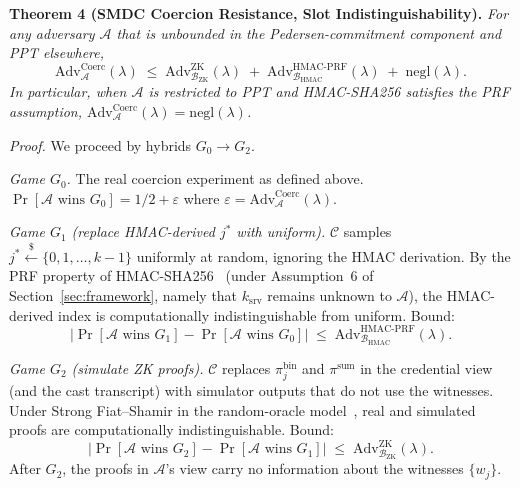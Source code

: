 \textbf{Theorem 4 (SMDC Coercion Resistance, Slot Indistinguishability).} \textit{For any adversary $\mathcal{A}$ that is unbounded in the Pedersen-commitment component and PPT elsewhere,}
\begin{equation}
    \mathrm{Adv}^{\mathrm{Coerc}}_{\mathcal{A}}(\lambda) \;\leq\; \mathrm{Adv}^{\mathrm{ZK}}_{\mathcal{B}_{\mathrm{ZK}}}(\lambda) \;+\; \mathrm{Adv}^{\mathrm{HMAC\text{-}PRF}}_{\mathcal{B}_{\mathrm{HMAC}}}(\lambda) \;+\; \mathrm{negl}(\lambda).
    \label{eq:t4-bound}
\end{equation}
\textit{In particular, when $\mathcal{A}$ is restricted to PPT and HMAC-SHA256 satisfies the PRF assumption, $\mathrm{Adv}^{\mathrm{Coerc}}_{\mathcal{A}}(\lambda) = \mathrm{negl}(\lambda)$.}

\textit{Proof.} We proceed by hybrids $G_0 \to G_2$.

\emph{Game $G_0$.} The real coercion experiment as defined above. $\Pr[\mathcal{A} \text{ wins } G_0] = 1/2 + \varepsilon$ where $\varepsilon = \mathrm{Adv}^{\mathrm{Coerc}}_{\mathcal{A}}(\lambda)$.

\emph{Game $G_1$ (replace HMAC-derived $j^*$ with uniform).} $\mathcal{C}$ samples $j^* \stackrel{\$}{\leftarrow} \{0, 1, \ldots, k-1\}$ uniformly at random, ignoring the HMAC derivation. By the PRF property of HMAC-SHA256~\cite{rfc2104,nist_fips198} (under Assumption~6 of Section~\ref{sec:framework}, namely that $k_{\mathrm{srv}}$ remains unknown to $\mathcal{A}$), the HMAC-derived index is computationally indistinguishable from uniform. Bound:
\begin{equation*}
    |\Pr[\mathcal{A} \text{ wins } G_1] - \Pr[\mathcal{A} \text{ wins } G_0]| \;\leq\; \mathrm{Adv}^{\mathrm{HMAC\text{-}PRF}}_{\mathcal{B}_{\mathrm{HMAC}}}(\lambda).
\end{equation*}

\emph{Game $G_2$ (simulate ZK proofs).} $\mathcal{C}$ replaces $\pi_j^{\text{bin}}$ and $\pi^{\text{sum}}$ in the credential view (and the cast transcript) with simulator outputs that do not use the witnesses. Under Strong Fiat--Shamir in the random-oracle model~\cite{bernhard2012,cramer1994or}, real and simulated proofs are computationally indistinguishable. Bound:
\begin{equation*}
    |\Pr[\mathcal{A} \text{ wins } G_2] - \Pr[\mathcal{A} \text{ wins } G_1]| \;\leq\; \mathrm{Adv}^{\mathrm{ZK}}_{\mathcal{B}_{\mathrm{ZK}}}(\lambda).
\end{equation*}
After $G_2$, the proofs in $\mathcal{A}$'s view carry no information about the witnesses $\{w_j\}$.


